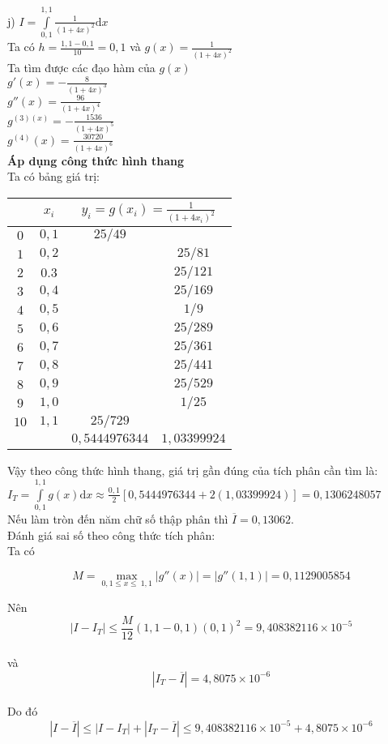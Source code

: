 j) $I=\int\limits_{0,1}^{1,1} \frac{1}{\left(1+4x\right)^2}\mathrm{d}x$\\
Ta có $h=\frac{1,1-0,1}{10}=0,1$ và $g\left(x\right)=\frac{1}{\left(1+4x\right)^2}$\\
Ta tìm được các đạo hàm của $g\left(x\right)$\\
$g'\left(x\right) = -\frac{8}{\left(1+4x\right)^3}$\\
$g''\left(x\right) = \frac{96}{\left(1+4x\right)^4}$\\
$g^{\left(3\right)\left(x\right)} = -\frac{1536}{\left(1+4x\right)^5}$\\
$g^{\left(4\right)}\left(x\right) =\frac{30720}{\left(1+4x\right)^6}$\\
\textbf{Áp dụng công thức hình thang}\\
Ta có bảng giá trị:\\
\begin{center}\begin{tabular}{|c|c|c|c|}
	\hline
	& $x_i$ & \multicolumn{2}{|c|}{$y_i=g\left(x_i\right)= \frac{1}{\left(1+4x_i\right)^2}$}\\ \hline 
	$0$ & $0,1$ & $25/49$ & \\ \hline
	$1$ & $0,2$ & & $25/81$ \\ \hline
	$2$ & $0.3$ & & $25/121$\\ \hline
	$3$ & $0,4$ & & $25/169$\\ \hline
	$4$ & $0,5$ & & $1/9$\\ \hline
	$5$ & $0,6$ & & $25/289$ \\ \hline
	$6$ & $0,7$ & & $25/361$ \\ \hline
	$7$ & $0,8$ & & $25/441$\\ \hline
	$8$ & $0,9$ & & $25/529$\\ \hline
	$9$ & $1,0$ & & $1/25$\\ \hline
	$10$ & $1,1$ & $25/729$ & \\ \hline
	& & $0,5444976344$ & $1,03399924$ \\ \hline
\end{tabular}\end{center}
Vậy theo công thức hình thang, giá trị gần đúng của tích phân cần tìm là:\\
$I_T=\int\limits_{0,1}^{1,1} g\left(x\right)\mathrm{d}x \approx \frac{0,1}{2}\left[0,5444976344 + 2\left(1,03399924\right) \right] =0,1306248057$\\
Nếu làm tròn đến năm chữ số thập phân thì $\overline{I}=0,13062$.\\
Đánh giá sai số theo công thức tích phân:\\
Ta có
\begin{center}
$$M=\underset{0,1 \leq x \leq\ 1,1}\max \left|g''\left(x\right) \right|= \left|g'' \left(1,1\right) \right|= 0,1129005854$$
\end{center}
Nên $$\left|I-I_T\right|\leq \frac{M}{12}\left(1,1-0,1\right)\left(0,1\right)^2=9,408382116\times 10^{-5}$$\\ và $$\left|I_T-\overline{I}\right| =4,8075\times 10^{-6}$$\\
Do đó\\
$$\left|I-\overline{I}\right| \leq \left| I- I_T \right| + \left| I_T -\overline{I} \right| \leq 9,408382116\times 10^{-5} + 4,8075\times 10^{-6} $$